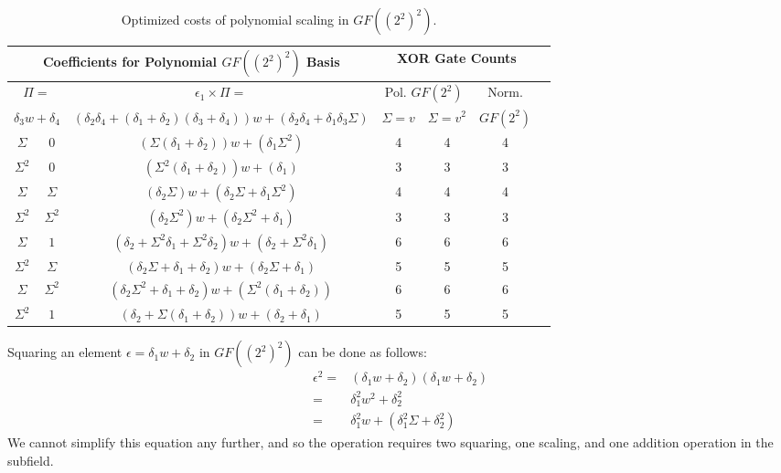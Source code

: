 \begin{table}[ht!]
\centering
\small
	\caption{Optimized costs of polynomial scaling in $GF((2^2)^2)$.}
	\label{tab:polynomialScaleOptimize}
	\begin{tabular}{|c|c|c|c|c|c|c|} \hline
		\multicolumn{3}{|c|}{Coefficients for Polynomial $GF((2^2)^2)$ Basis} & \multicolumn{3}{c|}{XOR Gate Counts} \\ \hline
		\multicolumn{2}{|c}{$\Pi = $} & \multicolumn{1}{|c|}{$\epsilon_1 \times \Pi = $} & \multicolumn{2}{|c|}{Pol. $GF(2^2)$} & \multicolumn{1}{c|}{Norm.} \\
		\multicolumn{2}{|c|}{$\delta_3 w + \delta_4$} & \multicolumn{1}{c}{$(\delta_2\delta_4 + (\delta_1 + \delta_2)(\delta_3 + \delta_4))w + (\delta_2\delta_4 + \delta_1\delta_3\Sigma)$} & \multicolumn{1}{|c|}{$\Sigma = v$} & \multicolumn{1}{|c|}{$\Sigma = v^2$} & \multicolumn{1}{|c|}{$GF(2^2)$} \\ \hline

		$\Sigma$ & $0$          & $(\Sigma(\delta_1 + \delta_2))w + (\delta_1\Sigma^2)$                         & 4 & 4 & 4  \\
		$\Sigma^2$ & $0$        & $(\Sigma^2(\delta_1 + \delta_2))w + (\delta_1)$                               & 3 & 3 & 3  \\
		$\Sigma$ & $\Sigma$     & $(\delta_2\Sigma)w + (\delta_2\Sigma + \delta_1\Sigma^2)$                     & 4 & 4 & 4  \\
		$\Sigma^2$ & $\Sigma^2$ & $(\delta_2\Sigma^2)w + (\delta_2\Sigma^2 + \delta_1)$                         & 3 & 3 & 3  \\
		$\Sigma$ & $1$          & $(\delta_2 + \Sigma^2\delta_1 + \Sigma^2\delta_2)w + (\delta_2 + \Sigma^2\delta_1)$ & 6 & 6 & 6  \\
		$\Sigma^2$ & $\Sigma$   & $(\delta_2\Sigma + \delta_1 + \delta_2)w + (\delta_2\Sigma + \delta_1)$       & 5 & 5 & 5 \\
		$\Sigma$ & $\Sigma^2$   & $(\delta_2\Sigma^2 + \delta_1 + \delta_2)w + (\Sigma^2(\delta_1 + \delta_2))$ & 6 & 6 & 6  \\
		$\Sigma^2$ & $1$        & $(\delta_2 + \Sigma(\delta_1 + \delta_2))w + (\delta_2 + \delta_1)$     & 5 & 5 & 5 \\ \hline
    \end{tabular}
\end{table}

Squaring an element $\epsilon = \delta_1 w + \delta_2$ in $GF((2^2)^2)$ can be done as follows:
\begin{align*}
\epsilon^2 = & (\delta_1 w + \delta_2)(\delta_1 w + \delta_2) \\
= & \delta_1^2 w^2 + \delta_2^2 \\
= & \delta_1^2 w + (\delta_1^2\Sigma + \delta_2^2)
\end{align*}
We cannot simplify this equation any further, and so the operation requires two squaring, one scaling, and one addition operation in the subfield. 


